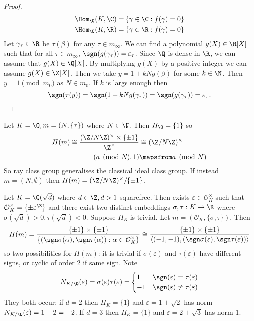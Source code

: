 \documentclass[a4paper]{article}
\renewcommand*{\O}{\mathcal{O}}
\begin{document}
\begin{proof}
  \begin{align*}
    \Hom_\Q(K, \C) &= \{\gamma \in \C: f(\gamma) = 0\} \\
    \Hom_\Q(K, \R) &= \{\gamma \in \R: f(\gamma) = 0\}
  \end{align*}
  Let \(\gamma_\tau \in \R\) be \(\tau(\beta)\) for any \(\tau \in m_\infty\). We can find a polynomial \(g(X) \in \R[X]\) such that for all \(\tau \in m_\infty\), \(\sgn(g(\gamma_\tau)) = \varepsilon_\tau\). Since \(\Q\) is dense in \(\R\), we can assume that \(g(X) \in \Q[X]\). By multiplying \(g(X)\) by a positive integer we can assume \(g(X) \in \Z[X]\). Then we take \(y = 1 + kNg(\beta)\) for some \(k \in \N\). Then \(y = 1 \pmod{m_0}\) as \(N \in m_0\). If \(k\) is large enough then
  \[
    \sgn(\tau(y)) = \sgn(1 + kN g(\gamma_\tau)) = \sgn(g(\gamma_\tau)) = \varepsilon_\tau.
  \]
\end{proof}

\begin{eg}
  Let \(K = \Q, m = (N, \{\tau\})\) where \(N \in \N\). Then \(H_\Q = \{1\}\) so
  \begin{align*}
    H(m) \cong \frac{(\Z/N\Z)^\times \times \{\pm 1\}}{\Z^\times} &\cong (\Z/N\Z)^\times \\
    (a \pmod N, 1) &\mapsfrom a \pmod N
  \end{align*}
  So ray class group generalises the classical ideal class group. If instead \(m = (N, \emptyset)\) then \(H(m) = (\Z/N\Z)^\times/\{\pm 1\}\).
\end{eg}

\begin{eg}
  Let \(K = \Q(\sqrt d)\) where \(d \in \Z, d > 1\) squarefree. Then exists \(\varepsilon \in \O_K^\times\) such that \(\O_K^\times = \{\pm \varepsilon^\Z\}\) and there exist two distinct embeddings \(\sigma, \tau: K \to \R\) where \(\sigma(\sqrt d) > 0, \tau(\sqrt d) < 0\). Suppose \(H_K\) is trivial. Let \(m = (\O_K, \{\sigma, \tau\})\). Then
  \[
    H(m)
    = \frac{\{\pm 1\} \times \{\pm 1\}}{\{(\sgn \sigma(\alpha), \sgn \tau(\alpha)): \alpha \in \O_K^\times\}}
    \cong \frac{\{\pm 1\} \times \{\pm 1\}}{\langle (-1, -1), (\sgn \sigma(\varepsilon), \sgn \tau(\varepsilon)) \rangle}
  \]
  so two possibilities for \(H(m)\): it is trivial if \(\sigma(\varepsilon)\) and \(\tau(\varepsilon)\) have different signs, or cyclic of order \(2\) if same sign. Note
  \[
    N_{K/\Q}(\varepsilon) = \sigma(\varepsilon) \tau(\varepsilon) =
    \begin{cases}
      1 & \sgn(\varepsilon) = \tau(\varepsilon) \\
      -1 & \sgn(\varepsilon) \ne \tau(\varepsilon)
    \end{cases}
  \]
  They both occur: if \(d = 2\) then \(H_K = \{1\}\) and \(\varepsilon = 1 + \sqrt 2\) has norm \(N_{K/\Q}(\varepsilon) = 1 - 2 = -2\). If \(d = 3\) then \(H_K = \{1\}\) and \(\varepsilon = 2 + \sqrt 3\) has norm \(1\).
\end{eg}
\end{document}
